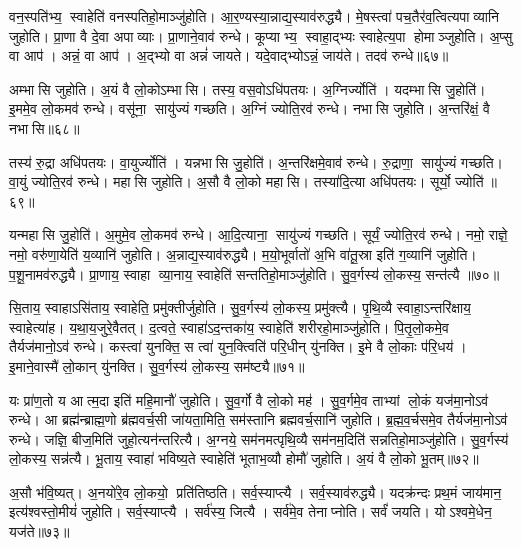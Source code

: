वन॒स्पति॑भ्य॒ स्वाहेति॑ वनस्पतिहो॒माञ्जु॑होति।
आ॒र॒ण्यस्या॒न्नाद्य॒स्याव॑रुद्ध्यै।
मे॒षस्त्वा॑ पच॒तैर॑व॒त्वित्यपाव्यानि जुहोति।
प्रा॒णा वै दे॒वा अपाव्याः।
प्रा॒णाने॒वाव॑ रुन्धे।
कूप्याभ्य॒ स्वाहा॒द्भ्यः स्वाहेत्य॒पा होमाञ्जुहोति।
अ॒प्सु वा आप॑।
अन्नं॒ वा आप॑।
अ॒द्भ्यो वा अन्नं॑ जायते।
यदे॒वाद्भ्योऽन्नं॒ जाय॑ते।
तदव॑ रुन्धे॥६७॥\anuvakamend[पू॒र्व॒दी॒क्षा जु॑होति॒ पूर्व॑ ए॒व द्वि॒षन्तं॒ भ्रातृ॑व्य॒मति॑ क्राम॒त्यन॑न्तरित्यै क्रामति रुन्धे॒ जाय॑त॒ एकं॑ च]

अम्भासि जुहोति।
अ॒यं वै लो॒कोऽम्भासि।
तस्य॒ वस॒वोऽधि॑पतयः।
अ॒ग्निर्ज्योति॑।
यदम्भासि जु॒होति॑।
इ॒ममे॒व लो॒कमव॑ रुन्धे।
वसू॑ना॒ सायु॑ज्यं गच्छति।
अ॒ग्निं ज्योति॒रव॑ रुन्धे।
नभासि जुहोति।
अ॒न्तरि॑क्षं॒ वै नभासि॥६८॥

तस्य॑ रु॒द्रा अधि॑पतयः।
वा॒युर्ज्योति॑।
यन्नभासि जु॒होति॑।
अ॒न्तरि॑क्षमे॒वाव॑ रुन्धे।
रु॒द्राणा॒ सायु॑ज्यं गच्छति।
वा॒युं ज्योति॒रव॑ रुन्धे।
महासि जुहोति।
अ॒सौ वै लो॒को महासि।
तस्या॑दि॒त्या अधि॑पतयः।
सूर्यो॒ ज्योति॑॥६९॥

यन्महासि जु॒होति॑।
अ॒मुमे॒व लो॒कमव॑ रुन्धे।
आ॒दि॒त्याना॒ सायु॑ज्यं गच्छति।
सूर्यं॒ ज्योति॒रव॑ रुन्धे।
नमो॒ राज्ञे॒ नमो॒ वरु॑णा॒येति॑ य॒व्यानि॑ जुहोति।
अ॒न्नाद्य॒स्याव॑रुद्ध्यै।
म॒यो॒भूर्वातो॑ अ॒भि वा॑तू॒स्रा इति॑ ग॒व्यानि॑ जुहोति।
प॒शू॒नामव॑रुद्ध्यै।
प्रा॒णाय॒ स्वाहा व्या॒नाय॒ स्वाहेति॑ सन्ततिहो॒माञ्जु॑होति।
सु॒व॒र्गस्य॑ लो॒कस्य॒ सन्त॑त्यै ॥७०॥

सि॒ताय॒ स्वाहाऽसि॑ताय॒ स्वाहेति॒ प्रमु॑क्तीर्जुहोति।
सु॒व॒र्गस्य॑ लो॒कस्य॒ प्रमु॑क्त्यै।
पृ॒थि॒व्यै स्वाहा॒ऽन्तरि॑क्षाय॒ स्वाहेत्या॑ह।
य॒था॒य॒जुरे॒वैतत्।
द॒त्वते॒ स्वाहा॑ऽद॒न्तका॑य॒ स्वाहेति॑ शरीरहो॒माञ्जु॑होति।
पि॒तृ॒लो॒कमे॒व तैर्यज॑मानो॒ऽव॑ रुन्धे।
कस्त्वा॑ युनक्ति॒ स त्वा॑ युन॒क्त्विति॑ परि॒धीन् यु॑नक्ति।
इ॒मे वै लो॒काः प॑रि॒धय॑।
इ॒माने॒वास्मै॑ लो॒कान् यु॑नक्ति।
सु॒व॒र्गस्य॑ लो॒कस्य॒ सम॑ष्ट्यै॥७१॥

यः प्रा॑ण॒तो य आत्म॒दा इति॑ महि॒मानौ॑ जुहोति।
सु॒व॒र्गो वै लो॒को मह॑।
सु॒व॒र्गमे॒व ताभ्यां लो॒कं यज॑मा॒नोऽव॑ रुन्धे।
आ ब्रह्म॑न्ब्राह्म॒णो ब्र॑ह्मवर्च॒सी जा॑यता॒मिति॒ सम॑स्तानि ब्रह्मवर्च॒सानि॑ जुहोति।
ब्र॒ह्म॒व॒र्चसमे॒व तैर्यज॑मा॒नोऽव॑ रुन्धे।
जज्ञि॒ बीज॒मिति॑ जुहो॒त्यन॑न्तरित्यै।
अ॒ग्नये॒ सम॑नमत्पृथि॒व्यै सम॑नम॒दिति॑ सन्नतिहो॒माञ्जु॑होति।
सु॒व॒र्गस्य॑ लो॒कस्य॒ सन्न॑त्यै।
भू॒ताय॒ स्वाहा॑ भविष्य॒ते स्वाहेति॑ भूताभ॒व्यौ होमौ॑ जुहोति।
अ॒यं वै लो॒को भू॒तम्॥७२॥

अ॒सौ भ॑वि॒ष्यत्।
अ॒नयो॑रे॒व लो॒कयो॒ प्रति॑तिष्ठति।
सर्व॒स्याप्त्यै।
सर्व॒स्याव॑रुद्ध्यै।
यदक्र॑न्दः प्रथ॒मं जाय॑मान॒ इत्य॑श्वस्तो॒मीयं॑ जुहोति।
सर्व॒स्याप्त्यै।
सर्व॑स्य॒ जित्यै।
सर्व॑मे॒व तेनाप्नोति।
सर्वं॑ जयति।
योऽश्वमे॒धेन॒ यज॑ते॥७३॥


